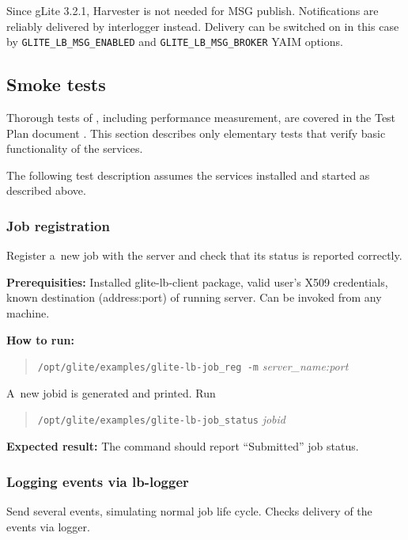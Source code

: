 Since gLite 3.2.1, \LB Harvester is not needed for MSG publish. Notifications are reliably delivered by interlogger instead. Delivery can be switched on in this case by \texttt{GLITE\_LB\_MSG\_ENABLED} and \texttt{GLITE\_LB\_MSG\_BROKER} YAIM options.

\subsection{Smoke tests}

Thorough tests of \LB, including performance measurement, are
covered in the \LB Test Plan document \cite{lbtp}.
This section describes only elementary tests that verify basic
functionality of the services.

The following test description assumes the \LB services installed
and started as described above.

\def\req{\noindent\textbf{Prerequisities:}\xspace}
\def\how{\noindent\textbf{How to run:}\xspace}
\def\result{\noindent\textbf{Expected result:}\xspace}

\subsubsection{Job registration}

Register a~new job with the \LB server and check that its status is
reported correctly.

\req Installed glite-lb-client package, valid user's X509 credentials,
known destination (address:port) of running \LB server.
Can be invoked from any machine.

\how 
\begin{quote}
\verb'/opt/glite/examples/glite-lb-job_reg -m' \emph{server\_name:port}
\end{quote}
A~new jobid is generated and printed.  Run 
\begin{quote}
\verb'/opt/glite/examples/glite-lb-job_status' \emph{jobid}
\end{quote}

\result
The command should report ``Submitted'' job status.

\subsubsection{Logging events via lb-logger}

\label{smoke-log}

Send several \LB events, simulating normal job life cycle.
Checks delivery of the events via \LB logger.


